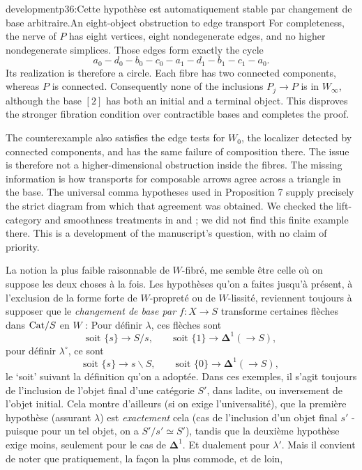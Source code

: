 \begin{dcomment}{development}{p36:Cette hypothèse est automatiquement stable par changement de base arbitraire.}{An eight-object obstruction to edge transport}
For completeness, the nerve of $P$ has eight vertices, eight nondegenerate edges, and no higher nondegenerate simplices. Those edges form exactly the cycle
\[
 a_0-d_0-b_0-c_0-a_1-d_1-b_1-c_1-a_0.
\]
Its realization is therefore a circle. Each fibre has two connected components, whereas $P$ is connected. Consequently none of the inclusions $P_j\to P$ is in $W_\infty$, although the base $[2]$ has both an initial and a terminal object. This disproves the stronger fibration condition over contractible bases and completes the proof.

The counterexample also satisfies the edge tests for $W_0$, the localizer detected by connected components, and has the same failure of composition there. The issue is therefore not a higher-dimensional obstruction inside the fibres. The missing information is how transports for composable arrows agree across a triangle in the base. The universal comma hypotheses used in Proposition 7 supply precisely the strict diagram from which that agreement was obtained. We checked the lift-category and smoothness treatments in \citet[\S4]{Maltsiniotis2005Asphericite} and \citet[\S\S1--2]{Maltsiniotis2012Exact}; we did not find this finite example there. This is a development of the manuscript's question, with no claim of priority.
\end{dcomment}


\leavevmode{}La notion la plus faible raisonnable de $W$-fibré, me semble être celle où on suppose les deux choses à la fois. Les hypothèses qu'on a faites jusqu'à présent, à l'exclusion de la forme forte de $W$-propreté ou de $W$-lissité, reviennent toujours à supposer que le \textit{changement de base par $f : X\longrightarrow S$} transforme certaines flèches dans $\mathrm{Cat}/S$ en $W$ : Pour définir $\lambda$, ces flèches sont
\[
\text{soit } \{s\}\longrightarrow S/s,\qquad \text{soit } \{1\}\longrightarrow\mathbf{\Delta}^1(\longrightarrow S),
\]
pour définir $\lambda^\circ$, ce sont
\[
\text{soit } \{s\}\longrightarrow s\backslash S,\qquad \text{soit } \{0\}\longrightarrow\mathbf{\Delta}^1(\longrightarrow S),
\]
le `soit' suivant la définition qu'on a adoptée. Dans ces exemples, il s'agit toujours de l'inclusion de l'objet final d'une catégorie $S'$, dans ladite, ou inversement de l'objet initial. Cela montre d'ailleurs (si on exige l'universalité), que la première hypothèse (assurant $\lambda$) est \textit{exactement} cela (cas de l'inclusion d'un objet final $s'$ - puisque pour un tel objet, on a $S'/s'\simeq S'$), tandis que la deuxième hypothèse exige moins, seulement pour le cas de $\mathbf{\Delta}^1$. Et dualement pour $\lambda'$. Mais il convient de noter que pratiquement, la façon la plus commode, et de loin,

